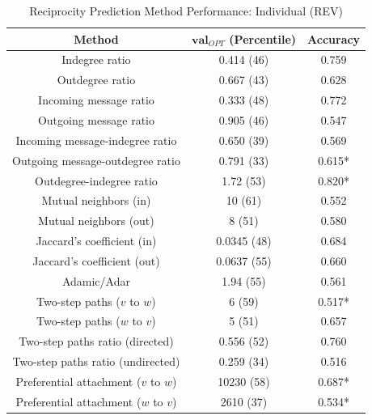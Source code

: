 \documentclass[conference]{IEEEtran}
\begin{document}
\begin{table}[!t]
\renewcommand{\arraystretch}{1.3}
\caption{Reciprocity Prediction Method Performance: Individual (REV)}
\label{table_recresults_indiv}
\centering
\begin{tabular}{|c||c|c|}
\hline
\bf{Method} & $\mathbf{val}_{OPT}$ (Percentile) & \bf{Accuracy} \\
\hline
Indegree ratio & 0.414 (46) & 0.759 \\
Outdegree ratio & 0.667 (43) & 0.628 \\
\hline
Incoming message ratio & 0.333 (48) & 0.772 \\
Outgoing message ratio & 0.905 (46) & 0.547 \\
\hline
Incoming message-indegree ratio & 0.650 (39) & 0.569 \\
Outgoing message-outdegree ratio & 0.791 (33) & 0.615* \\
\hline
Outdegree-indegree ratio & 1.72 (53) & 0.820* \\
\hline
Mutual neighbors (in) & 10 (61) & 0.552 \\
Mutual neighbors (out) & 8 (51) & 0.580 \\
\hline
Jaccard's coefficient (in) & 0.0345 (48) & 0.684 \\
Jaccard's coefficient (out) & 0.0637 (55) & 0.660 \\
\hline
Adamic/Adar & 1.94 (55) & 0.561 \\
\hline
Two-step paths ($v$ to $w$) & 6 (59) & 0.517* \\
Two-step paths ($w$ to $v$) & 5 (51) & 0.657 \\
Two-step paths ratio (directed) & 0.556 (52) & 0.760 \\
Two-step paths ratio (undirected) & 0.259 (34) & 0.516 \\
\hline
Preferential attachment ($v$ to $w$) & 10230 (58) & 0.687* \\
Preferential attachment ($w$ to $v$) & 2610 (37) & 0.534* \\
\hline
\end{tabular}
\end{table}
\end{document}

